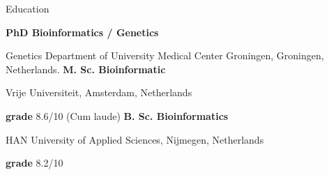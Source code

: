 \begin{rubric}{Education}

\entry*[May 2015 -- ]%
	\textbf{PhD Bioinformatics / Genetics} \par
	Genetics Department of University Medical Center Groningen, Groningen, Netherlands.
%
%
	\textbf{M. Sc. Bioinformatic} \par
	Vrije Universiteit, Amsterdam, Netherlands \par
	\textbf{grade} 8.6/10 (Cum laude)
%
%
	\textbf{B. Sc. Bioinformatics} \par
	HAN University of Applied Sciences, Nijmegen, Netherlands \par
	\textbf{grade} 8.2/10
%
\end{rubric}

